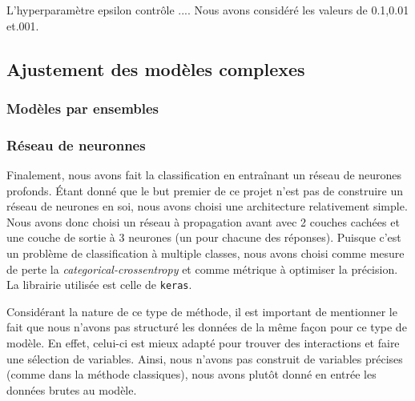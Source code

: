 L'hyperparamètre epsilon contrôle .... Nous avons considéré les valeurs de 0.1,0.01 et.001. 

\subsection{Ajustement des modèles complexes}

\subsubsection{Modèles par ensembles}

\subsubsection{Réseau de neuronnes}

Finalement, nous avons fait la classification en entraînant un réseau de neurones profonds. Étant donné que le but premier de ce projet n'est pas de construire un réseau de neurones en soi, nous avons choisi une architecture relativement simple. Nous avons donc choisi un réseau à propagation avant avec 2 couches cachées et une couche de sortie à 3 neurones (un pour chacune des réponses). Puisque c'est un problème de classification à multiple classes, nous avons choisi comme mesure de perte la \textit{categorical-crossentropy} et comme métrique à optimiser la précision. La librairie utilisée est celle de \texttt{keras}.

Considérant la nature de ce type de méthode, il est important de mentionner le fait que nous n'avons pas structuré les données de la même façon pour ce type de modèle. En effet, celui-ci est mieux adapté pour trouver des interactions et faire une sélection de variables. Ainsi, nous n'avons pas construit de variables précises (comme dans la méthode classiques), nous avons plutôt donné en entrée les données brutes au modèle.

